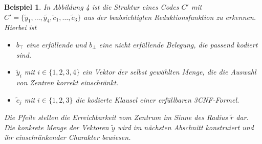 \documentclass[11pt]{article}
\theoremstyle{break}
\theoremstyle{norm}
\newtheorem{ex}{Beispiel}
\begin{document}
\begin{ex}
In Abbildung 4 ist die Struktur eines Codes $C'$ mit $C'=\{\tilde{y}_1, \ldots, \tilde{y_4}, \tilde{c}_1, \ldots, \tilde{c}_3\}$ aus der beabsichtigten Reduktionsfunktion zu erkennen. Hierbei ist 
\begin{itemize}
    \item $b_\top$ eine erfüllende und $b_\bot$ eine nicht erfüllende Belegung, die passend kodiert sind.
    \item $\tilde{y}_i$ mit $i\in\{1,2,3,4\}$ ein Vektor der selbst gewählten Menge, die die Auswahl von Zentren korrekt einschränkt.
    \item $\tilde{c}_j$ mit $i\in\{1,2,3\}$ die kodierte Klausel einer erfüllbaren 3CNF-Formel.
\end{itemize}
Die Pfeile stellen die Erreichbarkeit vom Zentrum im Sinne des Radius $\tilde{r}$ dar. Die konkrete Menge der Vektoren $\tilde{y}$ wird im nächsten Abschnitt konstruiert und ihr ein\-schränk\-ender Charakter bewiesen.
\end{ex}
\end{document}
